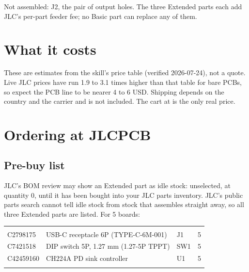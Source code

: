 Not assembled: J2, the pair of output holes. The three Extended parts each add JLC's per-part
feeder fee; no Basic part can replace any of them.

\section{What it costs}

\begin{hsstatrow}[3]
\end{hsstatrow}

These are estimates from the skill's price table (verified 2026-07-24), not a quote. Live JLC
prices have run 1.9 to 3.1 times higher than that table for bare PCBs, so expect the PCB line to be
nearer 4 to 6 USD. Shipping depends on the country and the carrier and is not included. The cart
at  is the only real price.


\clearpage
\section{Ordering at JLCPCB}

\subsection*{Pre-buy list}
JLC's BOM review may show an Extended part as idle stock: unselected, at quantity 0, until it has
been bought into your JLC parts inventory. JLC's public parts search cannot tell idle stock from
stock that assembles straight away, so all three Extended parts are listed. For 5 boards:

\begin{hsblock}
\begin{tabularx}{\linewidth}{L{1.9cm}Y L{1.2cm}R{1.6cm}}
\hstoprule
{} &  &  &  \\
\hstoprule
C2798175 & USB-C receptacle 6P (TYPE-C-6M-001) & J1 & 5 \\ \hline
C7421518 & DIP switch 5P, 1.27 mm (1.27-5P TPPT) & SW1 & 5 \\ \hline
C42459160 & CH224A PD sink controller & U1 & 5 \\
\hstoprule
\end{tabularx}
\end{hsblock}

